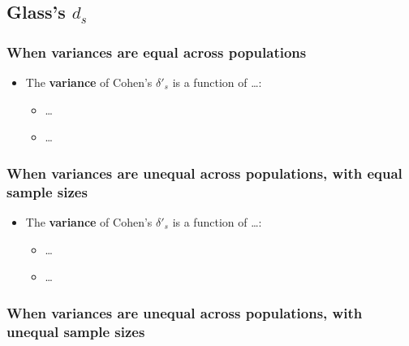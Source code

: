 \documentclass[
  man]{apa6}
\providecommand{\tightlist}{%
  \setlength{\itemsep}{0pt}\setlength{\parskip}{0pt}}
\begin{document}
\hypertarget{glasss-d_s-1}{%
\subsection{\texorpdfstring{Glass's \(d_s\)}{Glass's d\_s}}\label{glasss-d_s-1}}

\hypertarget{when-variances-are-equal-across-populations-4}{%
\subsubsection{When variances are equal across populations}\label{when-variances-are-equal-across-populations-4}}

\begin{itemize}
\tightlist
\item
  The \textbf{variance} of Cohen's \(\delta'_s\) is a function of \ldots:

  \begin{itemize}
  \tightlist
  \item
    \ldots{}
  \item
    \ldots{}
  \end{itemize}
\end{itemize}

\hypertarget{when-variances-are-unequal-across-populations-with-equal-sample-sizes-2}{%
\subsubsection{When variances are unequal across populations, with equal sample sizes}\label{when-variances-are-unequal-across-populations-with-equal-sample-sizes-2}}

\begin{itemize}
\tightlist
\item
  The \textbf{variance} of Cohen's \(\delta'_s\) is a function of \ldots:

  \begin{itemize}
  \tightlist
  \item
    \ldots{}
  \item
    \ldots{}
  \end{itemize}
\end{itemize}

\hypertarget{when-variances-are-unequal-across-populations-with-unequal-sample-sizes-2}{%
\subsubsection{When variances are unequal across populations, with unequal sample sizes}\label{when-variances-are-unequal-across-populations-with-unequal-sample-sizes-2}}
\end{document}
